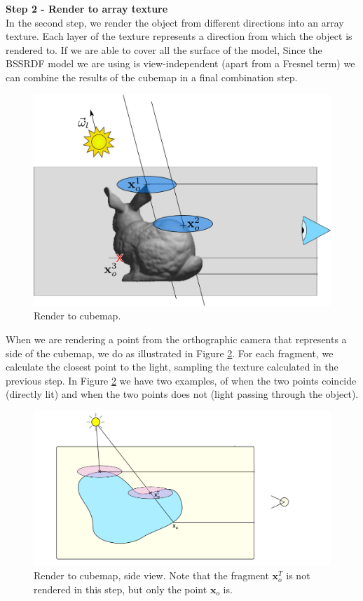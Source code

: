 \textbf{Step 2 - Render to array texture} \\
In the second step, we render the object from different directions into an array texture. Each layer of the texture represents a direction from which the object is rendered to. If we are able to cover all the surface of the model, 
Since the BSSRDF model we are using is view-independent (apart from a Fresnel term) we can combine the results of the cubemap in a final combination step.

\begin{figure}[!ht]
\centering
\includegraphics[width=0.5 \linewidth]{images/method/step2}
\caption{Render to cubemap.}
\label{fig:step2}
\end{figure} 

When we are rendering a point from the orthographic camera that represents a side of the cubemap, we do as illustrated in Figure \ref{fig:stepfrustum}. For each fragment, we calculate the closest point to the light, sampling the texture calculated in the previous step. In Figure  \ref{fig:stepfrustum} we have two examples, of when the two points coincide (directly lit) and when the two points does not (light passing through the object). 

\begin{figure}[!ht]
\centering
\includegraphics[width=\linewidth]{images/method/method_frustumside}
\caption{Render to cubemap, side view. Note that the fragment $\mathbf{x}^T_o$ is not rendered in this step, but only the point $\mathbf{x}_o$ is.}
\label{fig:stepfrustum}
\end{figure} 


